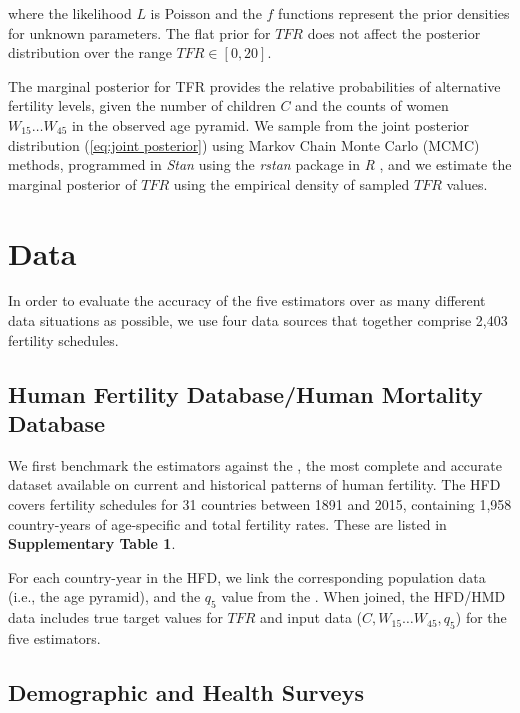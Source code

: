 \documentclass[12pt]{article}
\begin{document}
\noindent where the likelihood \(L\) is Poisson and the \(f\) functions
represent the prior densities for unknown parameters. The flat prior for
\(TFR\) does not affect the posterior distribution over the range
\(TFR\in[0,20]\).

The marginal posterior for TFR provides the relative probabilities of
alternative fertility levels, given the number of children \(C\) and the
counts of women \(W_{15}\ldots W_{45}\) in the observed age pyramid. We
sample from the joint posterior distribution (\ref{eq:joint posterior})
using Markov Chain Monte Carlo (MCMC) methods, programmed in
\textit{Stan} \citep{stanjss2017} using the \textit{rstan} package in
\textit{R} \citep{rstanpackage, Rlanguage}, and we estimate the marginal
posterior of \(TFR\) using the empirical density of sampled \(TFR\)
values.

\hypertarget{data}{%
\section{Data}\label{data}}

In order to evaluate the accuracy of the five estimators over as many
different data situations as possible, we use four data sources that
together comprise 2,403 fertility schedules.

\hypertarget{human-fertility-databasehuman-mortality-database}{%
\subsection{Human Fertility Database/Human Mortality
Database}\label{human-fertility-databasehuman-mortality-database}}

We first benchmark the estimators against the \citet{HFD}, the most
complete and accurate dataset available on current and historical
patterns of human fertility. The HFD covers fertility schedules for 31
countries between 1891 and 2015, containing 1,958 country-years of
age-specific and total fertility rates. These are listed in
\textbf{Supplementary Table 1}.

For each country-year in the HFD, we link the corresponding population
data (i.e., the age pyramid), and the \(q_5\) value from the
\citet{HMD}. When joined, the HFD/HMD data includes true target values
for \(TFR\) and input data (\(C, W_{15}\ldots W_{45}, q_5\)) for the
five estimators.

\hypertarget{demographic-and-health-surveys}{%
\subsection{Demographic and Health
Surveys}\label{demographic-and-health-surveys}}
\end{document}
